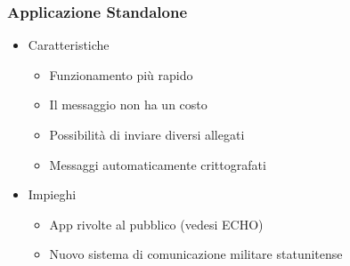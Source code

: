 \begin{frame}
 \frametitle{Applicazione Standalone}
 
 \begin{itemize}
  \item<1-> Caratteristiche
  \begin{itemize}
   \item Funzionamento più rapido
   \item Il messaggio non ha un costo
   \item Possibilità di inviare diversi allegati
   \item Messaggi automaticamente crittografati
  \end{itemize}
   \item<2-> Impieghi
  \begin{itemize}
   \item App rivolte al pubblico (vedesi ECHO)
   \item Nuovo sistema di comunicazione militare statunitense
  \end{itemize}
 \end{itemize}


\end{frame}
